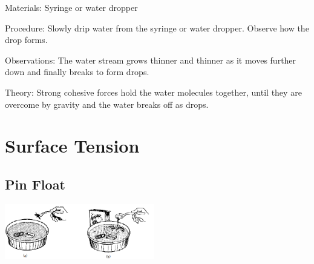 \begin{multicols}{2}
\begin{description*}
\item[Materials:]{Syringe or water dropper}
\item[Procedure:]{Slowly drip water from the syringe or water dropper. Observe how the drop forms.}
\item[Observations:]{The water stream grows thinner and thinner as it moves further down and finally breaks to form drops.}
\item[Theory:]{Strong cohesive forces hold the water molecules together, until they are overcome by gravity and the water breaks off as drops.}
\end{description*}


\section*{Surface Tension}


\subsection{Pin Float}

\begin{center}
\includegraphics[width=0.49\textwidth]{./img/source/pin-float.png}
\end{center}


\end{multicols}
